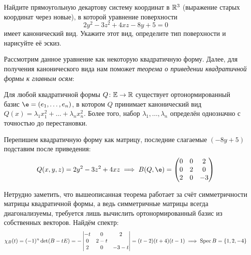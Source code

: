 \begin{condition}
    Найдите прямоугольную декартову систему координат в $\mathbb{R}^3$ (выражение старых координат через новые), в которой уравнение поверхности
    \[
        2y^2 - 3z^2 + 4xz - 8y + 5 = 0
    \]
    имеет канонический вид. Укажите этот вид, определите тип поверхности и нарисуйте её эскиз.
\end{condition}

Рассмотрим данное уравнение как некоторую квадратичную форму. Далее, для получения канонического вида нам поможет \textit{теорема о приведении квадратичной формы к главным осям}:

\begin{theorem}
    Для любой квадратичной формы $Q \colon \mathbb{E} \to \mathbb{R}$ существует ортонормированный базис $\e = (e_1, \ldots, e_n)$, в котором $Q$ принимает канонический вид $Q(x) = \lambda_1 x_1^2 + \ldots + \lambda_n x_n^2$. Более того, набор $\lambda_1, \ldots, \lambda_n$ определён однозначно с точностью до перестановки.
\end{theorem}

Перепишем квадратичную форму как матрицу, последние слагаемые $(- 8y + 5)$ подставим после приведения:
\[
    Q(x, y, z) = 2y^2 - 3z^2 + 4xz
    \implies
    B(Q, \e) =
    \begin{pmatrix}
        0 & 0 & 2  \\
        0 & 2 & 0  \\
        2 & 0 & -3
    \end{pmatrix}
\]

Нетрудно заметить, что вышеописанная теорема работает за счёт симметричности матрицы квадратичной формы, а ведь симметричные матрицы всегда диагонализуемы, требуется лишь вычислить ортонормированный базис из собственных векторов. Найдём спектр:
\[
    \chi_B(t) = (-1)^n \det(B -tE) = -
    \begin{vmatrix}
        -t & 0     & 2      \\
        0  & 2 - t &        \\
        2  & 0     & -3 - t
    \end{vmatrix}
    = (t - 2)(t + 4)(t - 1) \implies \operatorname{Spec} B = \{1, 2, -4\}
\]

